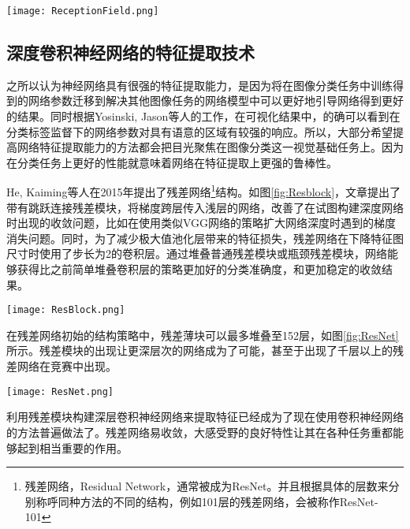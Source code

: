 \begin{figure*}[htbp]	
	\centering
	\texttt{[image: ReceptionField.png]}
	\caption{两种可视化感受野的方法\cite{fang2017reception}}
	\label{fig:ReceptionField}
\end{figure*}

\subsection{深度卷积神经网络的特征提取技术}
\label{subsec:factsdeepextract}
之所以认为神经网络具有很强的特征提取能力，是因为将在图像分类任务中训练得到的网络参数迁移到解决其他图像任务的网络模型中可以更好地引导网络得到更好的结果\cite{mishkin2015all}。同时根据Yosinski, Jason等人的工作\cite{yosinski2015understanding}，在可视化结果中，的确可以看到在分类标签监督下的网络参数对具有语意的区域有较强的响应。所以，大部分希望提高网络特征提取能力的方法都会把目光聚焦在图像分类这一视觉基础任务上。因为在分类任务上更好的性能就意味着网络在特征提取上更强的鲁棒性。

He, Kaiming等人在2015年提出了残差网络\footnote{残差网络，Residual Network，通常被成为ResNet。并且根据具体的层数来分别称呼同种方法的不同的结构，例如101层的残差网络，会被称作ResNet-101}结构\cite{He2015Deep}。如图\ref{fig:Resblock}，文章提出了带有跳跃连接残差模块，将梯度跨层传入浅层的网络，改善了在试图构建深度网络时出现的收敛问题，比如在使用类似VGG网络\cite{simonyan2014very}的策略扩大网络深度时遇到的梯度消失问题。同时，为了减少极大值池化层带来的特征损失，残差网络在下降特征图尺寸时使用了步长为2的卷积层。通过堆叠普通残差模块或瓶颈残差模块，网络能够获得比之前简单堆叠卷积层的策略更加好的分类准确度，和更加稳定的收敛结果。

\begin{figure*}[htbp]	
	\centering
	\texttt{[image: ResBlock.png]}
	\caption{残差模块结构：左图为普通残差模块，右图为瓶颈残差模块}
	\label{fig:Resblock}
\end{figure*}

在残差网络初始的结构策略中，残差薄块可以最多堆叠至152层，如图\ref{fig:ResNet}所示。残差模块的出现让更深层次的网络成为了可能，甚至于出现了千层以上的残差网络在竞赛中出现。

\begin{figure*}[htbp]	
	\centering
	\texttt{[image: ResNet.png]}
	\caption{残差网络结构策略}
	\label{fig:ResNet}
\end{figure*}

利用残差模块构建深层卷积神经网络来提取特征已经成为了现在使用卷积神经网络的方法普遍做法了。残差网络易收敛，大感受野的良好特性让其在各种任务重都能够起到相当重要的作用。

